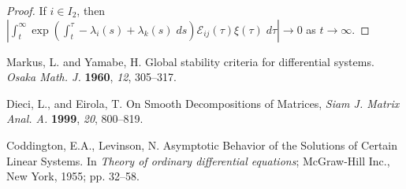 \documentclass[a4paper,11pt]{article}
\theoremstyle{remark}
\begin{document}
\begin{proof}
If $i\in I_2$, then $\left|\int_t^\infty \exp\left(\int_t^\tau -\lambda_i(s)+\lambda_k(s) \; ds\right)\mathcal{E}_{ij}(\tau)\xi(\tau) \; d\tau\right| \rightarrow 0$ as $t \rightarrow \infty$.
\end{proof}


\begin{thebibliography}{999}
Markus, L. and Yamabe, H. Global stability criteria for differential systems. {\em Osaka Math. J.} {\bf 1960}, {\em 12}, 305--317.

Dieci, L., and Eirola, T. On Smooth Decompositions of Matrices, {\em Siam J. Matrix Anal. A.} {\bf 1999}, {\em 20}, 800--819.


Coddington, E.A., Levinson, N. Asymptotic Behavior of the Solutions of Certain Linear Systems. In {\em Theory of ordinary differential equations}; McGraw-Hill Inc., New York, 1955; pp. 32--58.
\end{thebibliography}
\end{document}
